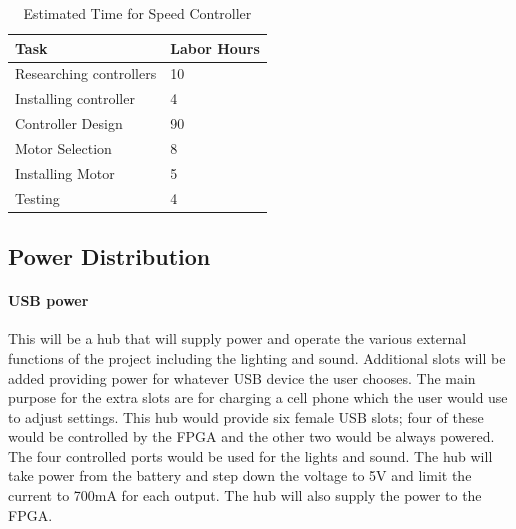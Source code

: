 \documentclass[12pt,article]{IEEEtran}
\begin{document}
       \begin{table}[H]        
            \renewcommand{\arraystretch}{1.3}
                \caption{Estimated Time for Speed Controller}
                
                \label{Estimated Time}
                
                \centering
                \begin{tabular}{p{5.5cm}|p{2cm}}
                \hline
                \bfseries   Task                        & \bfseries Labor Hours                         \\
                \hline\hline
                            Researching controllers     & 10                                            \\
                            Installing controller       & 4                                            \\  
                            Controller Design           & 90		\\
                            Motor Selection             & 8                                             \\
                            Installing Motor            & 5                                             \\  
                            Testing                     & 4                                             \\   
                            \hline
                \end{tabular}
        \end{table}

    \subsection{\bfseries Power Distribution}
        \paragraph{\bfseries USB power}
            This will be a hub that will supply power and operate the various external functions of the 
            project including the lighting and sound. Additional slots will be added providing power for 
            whatever USB device the user chooses.  The main purpose for the extra slots are for charging a 
            cell phone which the user would use to adjust settings. This hub would provide six female USB 
            slots; four of these would be controlled by the FPGA and the other two would be always powered.
            The four controlled ports would be used for the lights and sound. The hub will take power from 
            the battery and step down the voltage to 5V and limit the current to 700mA for each output. The
            hub will also supply the power to the FPGA.
\end{document}
